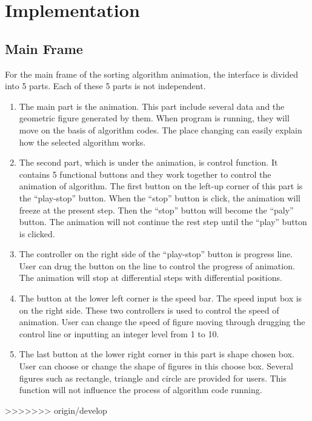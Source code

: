 \documentclass[paper=a4, fontsize=11pt,twoside]{scrartcl}		%
\begin{document}
\section{Implementation}
\subsection{Main Frame}
For the main frame of the sorting algorithm animation, the interface is divided into 5 parts. Each of these 5 parts is not independent. 
\begin{enumerate}
   \item The main part is the animation. This part include several data and the geometric figure generated by them. When program is running, they will move on the basis of algorithm codes. The place changing can easily explain how the selected algorithm works. 
   \item The second part, which is under the animation, is control function. It contains 5 functional buttons and they work together to control the animation of algorithm. The first button on the left-up corner of this part is the “play-stop” button. When the “stop” button is click, the animation will freeze at the present step. Then the “stop” button will become the “paly” button. The animation will not continue the rest step until the “play” button is clicked. 
   \item The controller on the right side of the “play-stop” button is progress line. User can drug the button on the line to control the progress of animation. The animation will stop at differential steps with differential positions. 
   \item The button at the lower left corner is the speed bar. The speed input box is on the right side. These two controllers is used to control the speed of animation. User can change the speed of figure moving through drugging the control line or inputting an integer level from 1 to 10. 
   \item The last button at the lower right corner in this part is shape chosen box. User can choose or change the shape of figures in this choose box. Several figures such as rectangle, triangle and circle are provided for users. This function will not influence the process of algorithm code running. 

\end{enumerate}
>>>>>>> origin/develop


\end{document}
